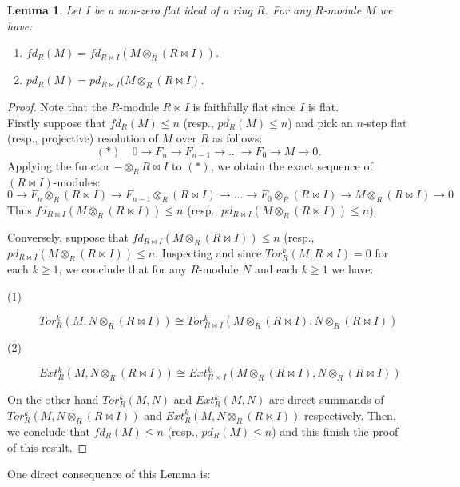 \documentclass{amsart}
\newtheorem{lemma}[theorem]{Lemma}
\theoremstyle{definition}
\theoremstyle{remark}
\theoremstyle{Definition and Notation}
\begin{document}
\begin{lemma}\label{2} Let $I$ be a non-zero flat ideal of a ring
$R$. For any $R$-module $M$ we have:
\begin{enumerate}
    \item  $fd_{R}(M)= fd_{R\bowtie I}(M\otimes_{R}(R\bowtie I))$.
    \item  $pd_{R}(M) =pd_{R\bowtie I}(M\otimes_{R}(R\bowtie I)$.

\end{enumerate}
\end{lemma}
\begin{proof}
 Note that the $R$-module $R\bowtie I$ is faithfully flat
since $I$ is flat.\\
 Firstly suppose that $fd_R(M)\leq n$ (resp.,
$pd_R(M)\leq n$) and pick an $n$-step flat (resp., projective)
resolution of $M$ over $R$ as follows:
    $$(\ast)\quad 0\rightarrow F_n\rightarrow F_{n-1} \rightarrow
...\rightarrow F_0 \rightarrow M\rightarrow 0.$$
 Applying the functor  $-\otimes_RR\bowtie I$ to $(\ast)$, we obtain
the  exact sequence of $(R\bowtie I)$-modules:
$$0\rightarrow
F_n\otimes_{R}(R\bowtie I)\rightarrow F_{n-1}\otimes_{R}(R\bowtie
I) \rightarrow ...\rightarrow F_0\otimes_{R}(R\bowtie I)
\rightarrow M\otimes_{R}(R\bowtie I)\rightarrow 0$$ Thus
$fd_{R\bowtie I}(M\otimes_{R}(R\bowtie I))\leq n$ (resp.,
$pd_{R\bowtie I}(M\otimes_{R}(R\bowtie I))\leq n$).

Conversely, suppose that $fd_{R\bowtie I}(M\otimes_{R}(R\bowtie
I))\leq n$ (resp., $pd_{R\bowtie I}(M\otimes_{R}(R\bowtie I))\leq
n$. Inspecting \cite[page 118]{CE} and since
$Tor^{k}_{R}(M,R\bowtie I)=0$
 for each  $k\geq1$, we conclude that  for any
$R$-module $N$ and each  $k\geq 1$ we have:

\begin{description}
    \item[(1)] $Tor^{k}_{R}(M,N\otimes_{R} (R\bowtie I))\cong Tor^{k}_{R\bowtie I}(M\otimes_{R} (R\bowtie I),
N\otimes_{R} (R\bowtie I))$
    \item[(2)] $Ext^{k}_{R}(M,N\otimes_{R}
(R\bowtie I))\cong Ext^{k}_{R\bowtie I}(M\otimes_{R} (R\bowtie
I),N\otimes_{R} (R\bowtie I))$
\end{description}

On the other hand $Tor_R^k(M,N)$ and $Ext_R^k(M,N)$ are direct
summands of $Tor^{k}_{R}(M,N\otimes_{R} (R\bowtie I))$ and
$Ext^{k}_{R}(M,N\otimes_{R} (R\bowtie I))$ respectively. Then, we
conclude that $fd_R(M)\leq n$ (resp., $pd_R(M)\leq n$) and this
finish the proof of this result.
\end{proof}
One direct consequence of this Lemma is:
\end{document}
